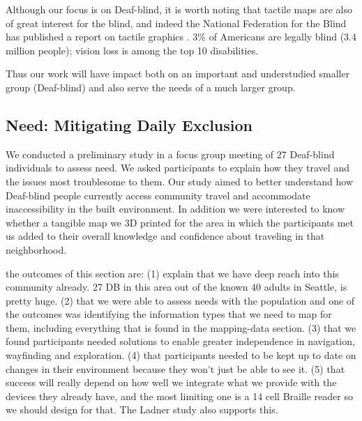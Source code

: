 Although our focus is on Deaf-blind, it is worth noting that tactile maps are also of great interest for the blind, and indeed the National Federation for the Blind has published a report on tactile graphics \cite{lobben2015tactile}. 3\% of Americans are legally blind (3.4 million people); vision loss is among the top 10 disabilities.

Thus our work will have impact both on an important and understudied smaller group (Deaf-blind) and also serve the needs of a much larger group. 


\subsection{Need: Mitigating Daily Exclusion}

We conducted a  preliminary study in a focus group meeting of 27 Deaf-blind individuals to assess need. We asked participants to explain how they travel and the issues most troublesome to them. 
Our study aimed to better understand how Deaf-blind people currently access community travel and 
accommodate inaccessibility in the built environment. In addition we were interested to know whether a tangible map we 3D printed for the area in which the participants met us added to their overall knowledge and confidence about traveling in that neighborhood.

\ac{the outcomes of this section are:
(1) explain that we have deep reach into this community already. 27 DB in this area out of the known 40 adults in Seattle, is pretty huge.
(2) that we were able to assess needs with the population and one of the outcomes was identifying the information types that we need to map for them, including everything that is found in the mapping-data section.
(3) that we found participants needed solutions to enable greater independence in navigation, wayfinding and exploration.
(4) that participants needed to be kept up to date on changes in their environment because they won't just be able to see it.
(5) that success will really depend on how well we integrate what we provide with the devices they already have, and the most limiting one is a 14 cell Braille reader so we should design for that. The Ladner study also supports this.
}

